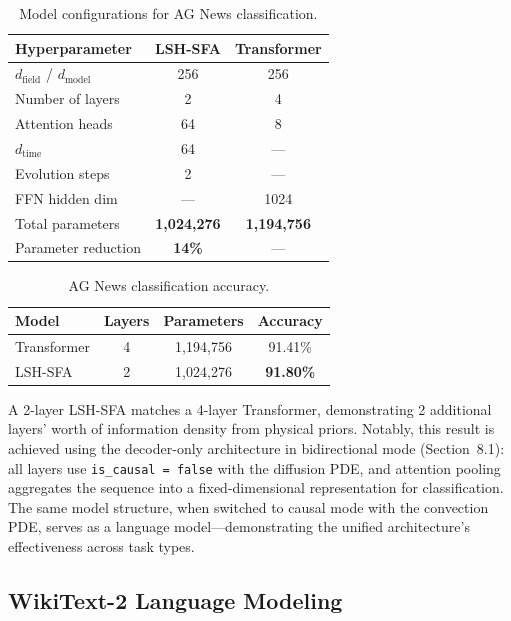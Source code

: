 \documentclass{article}
\begin{document}
\begin{table}[h]
\centering
\caption{Model configurations for AG News classification.}
\label{tab:agnews_config}
\begin{tabular}{lcc}
\toprule
\textbf{Hyperparameter} & \textbf{LSH-SFA} & \textbf{Transformer} \\
\midrule
$d_{\text{field}}$ / $d_{\text{model}}$ & 256 & 256 \\
Number of layers & 2 & 4 \\
Attention heads & 64 & 8 \\
$d_{\text{time}}$ & 64 & --- \\
Evolution steps & 2 & --- \\
FFN hidden dim & --- & 1024 \\
Total parameters & \textbf{1,024,276} & \textbf{1,194,756} \\
Parameter reduction & \textbf{14\%} & --- \\
\bottomrule
\end{tabular}
\end{table}

\begin{table}[h]
\centering
\caption{AG News classification accuracy.}
\label{tab:agnews_results}
\begin{tabular}{lccc}
\toprule
\textbf{Model} & \textbf{Layers} & \textbf{Parameters} & \textbf{Accuracy} \\
\midrule
Transformer & 4 & 1,194,756 & 91.41\% \\
LSH-SFA & 2 & 1,024,276 & \textbf{91.80\%} \\
\bottomrule
\end{tabular}
\end{table}

A 2-layer LSH-SFA matches a 4-layer Transformer, demonstrating 2 additional layers' worth of information density from physical priors. Notably, this result is achieved using the decoder-only architecture in bidirectional mode (Section~8.1): all layers use \texttt{is\_causal = false} with the diffusion PDE, and attention pooling aggregates the sequence into a fixed-dimensional representation for classification. The same model structure, when switched to causal mode with the convection PDE, serves as a language model---demonstrating the unified architecture's effectiveness across task types.

\subsection{WikiText-2 Language Modeling}
\end{document}
